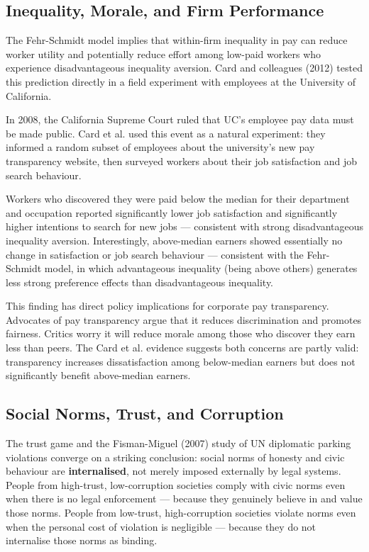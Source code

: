 \documentclass[12pt, letterpaper]{article}
\begin{document}
\subsection{Inequality, Morale, and Firm Performance}


The Fehr-Schmidt model implies that within-firm inequality in pay can reduce worker utility and potentially reduce effort among low-paid workers who experience disadvantageous inequality aversion. Card and colleagues (2012) tested this prediction directly in a field experiment with employees at the University of California.

In 2008, the California Supreme Court ruled that UC's employee pay data must be made public. Card et al. used this event as a natural experiment: they informed a random subset of employees about the university's new pay transparency website, then surveyed workers about their job satisfaction and job search behaviour.

Workers who discovered they were paid below the median for their department and occupation reported significantly lower job satisfaction and significantly higher intentions to search for new jobs --- consistent with strong disadvantageous inequality aversion. Interestingly, above-median earners showed essentially no change in satisfaction or job search behaviour --- consistent with the Fehr-Schmidt model, in which advantageous inequality (being above others) generates less strong preference effects than disadvantageous inequality.

This finding has direct policy implications for corporate pay transparency. Advocates of pay transparency argue that it reduces discrimination and promotes fairness. Critics worry it will reduce morale among those who discover they earn less than peers. The Card et al. evidence suggests both concerns are partly valid: transparency increases dissatisfaction among below-median earners but does not significantly benefit above-median earners.


\subsection{Social Norms, Trust, and Corruption}


The trust game and the Fisman-Miguel (2007) study of UN diplomatic parking violations converge on a striking conclusion: social norms of honesty and civic behaviour are \textbf{internalised}, not merely imposed externally by legal systems. People from high-trust, low-corruption societies comply with civic norms even when there is no legal enforcement --- because they genuinely believe in and value those norms. People from low-trust, high-corruption societies violate norms even when the personal cost of violation is negligible --- because they do not internalise those norms as binding.
\end{document}
